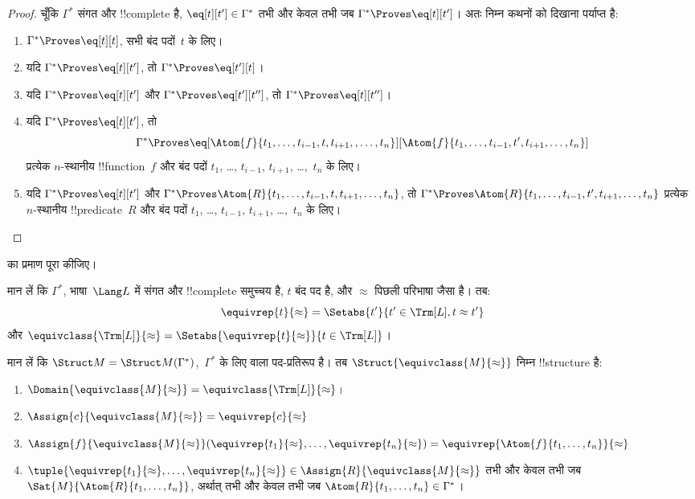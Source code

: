 \documentclass[../../../include/open-logic-section]{subfiles}
\begin{document}
\begin{proof}
चूँकि $\Gamma^*$ संगत और !!{complete} है, $\eq[t][t'] \in
\Gamma^*$ तभी और केवल तभी जब $\Gamma^* \Proves \eq[t][t']$। अतः निम्न
कथनों को दिखाना पर्याप्त है:
\begin{enumerate}
\item $\Gamma^* \Proves \eq[t][t]$, सभी बंद पदों~$t$ के लिए।
\item यदि $\Gamma^* \Proves \eq[t][t']$, तो $\Gamma^* \Proves \eq[t'][t]$।
\item यदि $\Gamma^* \Proves \eq[t][t']$ और $\Gamma^* \Proves
  \eq[t'][t'']$, तो $\Gamma^* \Proves \eq[t][t'']$।
\item यदि $\Gamma^* \Proves \eq[t][t']$, तो
\[
\Gamma^* \Proves
\eq[\Atom{f}{t_1,\dots,t_{i-1},t,t_{i+1},,\dots,t_n}][\Atom{f}{t_1,\dots,t_{i-1},t',t_{i+1},\dots,t_n}]
\]
प्रत्येक $n$-स्थानीय !!{function}~$f$ और बंद पदों $t_1$, \dots,
$t_{i-1}$, $t_{i+1}$, \dots,~$t_n$ के लिए।
\item यदि $\Gamma^* \Proves \eq[t][t']$ और
$\Gamma^* \Proves
\Atom{R}{t_1,\dots,t_{i-1},t,t_{i+1},\dots,t_n}$, तो
$\Gamma^* \Proves \Atom{R}{t_1,\dots,t_{i-1},t',t_{i+1},\dots,t_n}$
प्रत्येक $n$-स्थानीय !!{predicate}~$R$ और बंद पदों $t_1$, \dots,
$t_{i-1}$, $t_{i+1}$, \dots,~$t_n$ के लिए।
\end{enumerate}
\end{proof}

\begin{prob}
 का प्रमाण पूरा कीजिए।
\end{prob}

\begin{defn}
मान लें कि $\Gamma^*$, भाषा~$\Lang L$ में संगत और !!{complete} समुच्चय है,
$t$ बंद पद है, और $\approx$ पिछली परिभाषा जैसा है। तब:
\[
\equivrep{t}{\approx} = \Setabs{t'}{t'\in \Trm[L], t \approx t'}
\]
और $\equivclass{\Trm[L]}{\approx} = \Setabs{\equivrep{t}{\approx}}{t \in \Trm[L]}$।
\end{defn}

\begin{defn}
मान लें कि $\Struct M = \Struct M(\Gamma^*)$,~$\Gamma^*$ के लिए
 वाला पद-प्रतिरूप है। तब
$\Struct{\equivclass{M}{\approx}}$ निम्न !!{structure} है:
\begin{enumerate}
\item $\Domain{\equivclass{M}{\approx}} = \equivclass{\Trm[L]}{\approx}$।
\item $\Assign{c}{\equivclass{M}{\approx}} = \equivrep{c}{\approx}$
\item $\Assign{f}{\equivclass{M}{\approx}}(\equivrep{t_1}{\approx}, \dots,
  \equivrep{t_n}{\approx}) = \equivrep{\Atom{f}{t_1,\dots, t_n}}{\approx}$
\item $\tuple{\equivrep{t_1}{\approx}, \dots, \equivrep{t_n}{\approx}} \in
  \Assign{R}{\equivclass{M}{\approx}}$ तभी और केवल तभी जब
  $\Sat{M}{\Atom{R}{t_1,\dots, t_n}}$, अर्थात् तभी और केवल तभी जब
  $\Atom{R}{t_1,\dots,
  t_n} \in \Gamma^*$।
\end{enumerate}
\end{defn}
\end{document}
